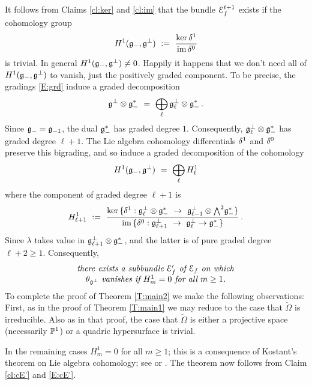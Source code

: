 \documentclass[12pt]{amsart}
\numberwithin{equation}{section}
\numberwithin{table}{section}
\numberwithin{figure}{section}
\begin{document}
It follows from Claims \ref{cl:ker} and \ref{cl:im} that the bundle $\mathcal E_f^{\ell+1}$ exists if the cohomology group
\[
  H^1({\mathfrak{g}}_-,{\mathfrak{g}}^\perp) \ := \ \frac{\mathrm{ker}\,\delta^1}{\mathrm{im}\,\delta^0}
\]
is trivial.  In general $H^1({\mathfrak{g}}_-,{\mathfrak{g}}^\perp) \not=0$.  Happily it happens that we don't need all of $H^1({\mathfrak{g}}_-,{\mathfrak{g}}^\perp)$ to vanish, just the positively graded component.  To be precise, the gradings \eqref{E:grd} induce a graded decomposition 
\[
  \fg^\perp \ot \fg_-^* \ = \ 
  \bigoplus_\ell \fg^\perp_\ell \ot \fg_-^* \,.
\]
Since ${\mathfrak{g}}_- = {\mathfrak{g}}_{-1}$, the dual ${\mathfrak{g}}_-^*$ has graded degree $1$.  Consequently, ${\mathfrak{g}}^\perp_\ell \otimes {\mathfrak{g}}_-^*$ has graded degree $\ell+1$.  The Lie algebra cohomology differentials $\delta^1$ and $\delta^0$ preserve this bigrading, and so induce a graded decomposition of the cohomology
\[
  H^1({\mathfrak{g}}_-,{\mathfrak{g}}^\perp) \ = \ \bigoplus_\ell H^1_\ell
\]
where the component of graded degree $\ell+1$ is 
\[
  H^1_{\ell+1} \ := \ 
  \frac{\tker\,\{\d^1 : \fg^\perp_\ell \ot \fg_-^* \ \to \ 
  			\fg^\perp_{\ell-1} \ot \tw^2 \fg_-^*\}}
  {\tim\,\{\d^0 : \fg^\perp_{\ell+1} \ \to \ \fg^\perp_\ell \to \fg_-^* \}} \,.
\]
Since $\lambda$ takes value in ${\mathfrak{g}}^\perp_{\ell+1} \otimes {\mathfrak{g}}_-^*$, and the latter is of pure graded degree $\ell+2 \ge 1$.  Consequently, 
\begin{equation}\label{E:cE'}
\begin{array}{c}
\hbox{\emph{there exists a subbundle $\mathcal E_f'$ of $\mathcal E_f$ on which}}\\
\hbox{\emph{$\theta_{{\mathfrak{g}}^\perp}$ vanishes if $H^1_m = 0$ for all $m \ge 1$.}}
\end{array}
\end{equation}
To complete the proof of Theorem \ref{T:main2} we make the following observations: First, as in the proof of Theorem \ref{T:main1} we may reduce to the case that $\check \Omega$ is irreducible.  Also as in that proof, the case that $\check\Omega$ is either a projective space (necessarily $\mathbb P^1$) or a quadric hypersurface is trivial.

In the remaining cases $H^1_m = 0$ for all $m \ge 1$; this is a consequence of Kostant's theorem \cite{MR0142696} on Lie algebra cohomology; see \cite[Proposition 7]{MR2030098} or \cite[\S7.3]{MR3004278}.  The theorem now follows from Claim \ref{cl:cE'} and \eqref{E:cE'}.
\end{document}
